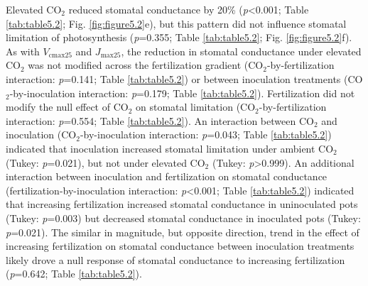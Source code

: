 Elevated CO$_2$ reduced stomatal conductance by 20\% (\textit{p}<0.001; Table \ref{tab:table5.2}; Fig. \ref{fig:figure5.2}e), but this pattern did not influence stomatal limitation of photosynthesis (\textit{p}=0.355; Table \ref{tab:table5.2}; Fig. \ref{fig:figure5.2}f). As with $V_\mathrm{cmax25}$ and $J_\mathrm{max25}$, the reduction in stomatal conductance under elevated CO$_2$ was not modified across the fertilization gradient (CO$_2$-by-fertilization interaction: \textit{p}=0.141; Table \ref{tab:table5.2}) or between inoculation treatments (CO$_2$-by-inoculation interaction: \textit{p}=0.179; Table \ref{tab:table5.2}). Fertilization did not modify the null effect of CO$_2$ on stomatal limitation (CO$_2$-by-fertilization interaction: \textit{p}=0.554; Table \ref{tab:table5.2}). An interaction between CO$_2$ and inoculation (CO$_2$-by-inoculation interaction: \textit{p}=0.043; Table \ref{tab:table5.2}) indicated that inoculation increased stomatal limitation under ambient CO$_2$ (Tukey: \textit{p}=0.021), but not under elevated CO$_2$ (Tukey: \textit{p}>0.999). An additional interaction between inoculation and fertilization on stomatal conductance (fertilization-by-inoculation interaction: \textit{p}<0.001; Table \ref{tab:table5.2}) indicated that increasing fertilization increased stomatal conductance in uninoculated pots (Tukey: \textit{p}=0.003) but decreased stomatal conductance in inoculated pots (Tukey: \textit{p}=0.021). The similar in magnitude, but opposite direction, trend in the effect of increasing fertilization on stomatal conductance between inoculation treatments likely drove a null response of stomatal conductance to increasing fertilization (\textit{p}=0.642; Table \ref{tab:table5.2}).

